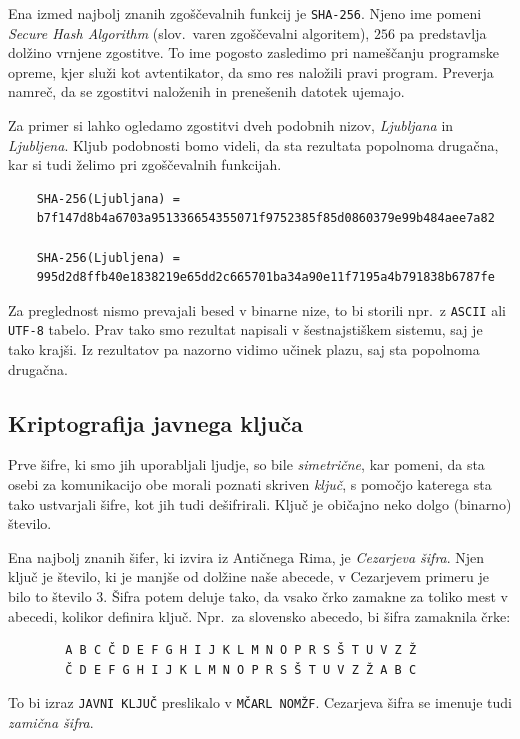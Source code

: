 \begin{primer}
    Ena izmed najbolj znanih zgoščevalnih funkcij je \texttt{SHA-256}. Njeno ime pomeni \textit{Secure
    Hash Algorithm} (slov.\ varen zgoščevalni algoritem), $256$ pa predstavlja dolžino vrnjene zgostitve.
    To ime pogosto zasledimo pri nameščanju programske opreme, kjer služi kot avtentikator, da smo res
    naložili pravi program. Preverja namreč, da se zgostitvi naloženih in prenešenih datotek ujemajo.

    Za primer si lahko ogledamo zgostitvi dveh podobnih nizov, \textit{Ljubljana} in \textit{Ljubljena}. 
    Kljub podobnosti bomo videli, da sta rezultata popolnoma drugačna, kar si tudi želimo pri zgoščevalnih 
    funkcijah.
    \begin{verbatim}
    SHA-256(Ljubljana) =
    b7f147d8b4a6703a951336654355071f9752385f85d0860379e99b484aee7a82

    SHA-256(Ljubljena) =
    995d2d8ffb40e1838219e65dd2c665701ba34a90e11f7195a4b791838b6787fe
    \end{verbatim}
    Za preglednost nismo prevajali besed v binarne nize, to bi storili npr.\ z \texttt{ASCII} ali \texttt{UTF-8}
    tabelo. Prav tako smo rezultat napisali v šestnajstiškem sistemu, saj je tako krajši. Iz rezultatov
    pa nazorno vidimo učinek plazu, saj sta popolnoma drugačna.
\end{primer}

\subsection{Kriptografija javnega ključa}
Prve šifre, ki smo jih uporabljali ljudje, so bile \textit{simetrične}, kar pomeni, da sta osebi
za komunikacijo obe morali poznati skriven \textit{ključ}, s pomočjo katerega sta tako ustvarjali
šifre, kot jih tudi dešifrirali. Ključ je običajno neko dolgo (binarno) število.

\begin{primer}
    Ena najbolj znanih šifer, ki izvira iz Antičnega Rima, je \textit{Cezarjeva šifra}. Njen ključ 
    je število, ki je manjše od dolžine naše abecede, v Cezarjevem primeru je bilo to število $3$.
    Šifra potem deluje tako, da vsako črko zamakne za toliko mest v abecedi, kolikor definira 
    ključ. Npr.\ za slovensko abecedo, bi šifra zamaknila črke:
    \begin{verbatim}
        A B C Č D E F G H I J K L M N O P R S Š T U V Z Ž
        Č D E F G H I J K L M N O P R S Š T U V Z Ž A B C
    \end{verbatim}
    To bi izraz \texttt{JAVNI KLJUČ} preslikalo v \texttt{MČARL NOMŽF}. Cezarjeva šifra se imenuje 
    tudi \textit{zamična šifra}.
\end{primer}

